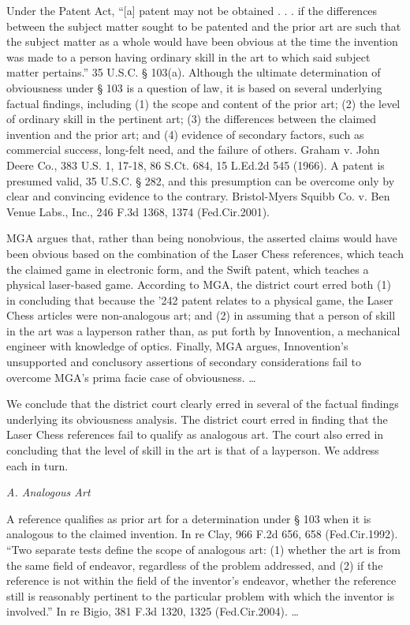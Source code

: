 Under the Patent Act, ``[a] patent may not be obtained . . . if the differences
between the subject matter sought to be patented and the prior art are such
that the subject matter as a whole would have been obvious at the time the
invention was made to a person having ordinary skill in the art to which said
subject matter pertains.'' 35 U.S.C. {\S} 103(a). Although the ultimate
determination of obviousness under {\S} 103 is a question of law, it is based
on several underlying factual findings, including (1) the scope and content of
the prior art; (2) the level of ordinary skill in the pertinent art; (3) the
differences between the claimed invention and the prior art; and (4) evidence
of secondary factors, such as commercial success, long-felt need, and the
failure of others. Graham v. John Deere Co., 383 U.S. 1, 17-18, 86 S.Ct. 684,
15 L.Ed.2d 545 (1966). A patent is presumed valid, 35 U.S.C. {\S} 282, and this
presumption can be overcome only by clear and convincing evidence to the
contrary. Bristol-Myers Squibb Co. v. Ben Venue Labs., Inc., 246 F.3d 1368,
1374 (Fed.Cir.2001).

MGA argues that, rather than being nonobvious, the asserted claims would have
been obvious based on the combination of the Laser Chess references, which
teach the claimed game in electronic form, and the Swift patent, which teaches
a physical laser-based game. According to MGA, the district court erred both
(1) in concluding that because the '242 patent relates to a physical game, the
Laser Chess articles were non-analogous art; and (2) in assuming that a person
of skill in the art was a layperson rather than, as put forth by Innovention, a
mechanical engineer with knowledge of optics. Finally, MGA argues,
Innovention's unsupported and conclusory assertions of secondary considerations
fail to overcome MGA's prima facie case of obviousness. {\dots}

We conclude that the district court clearly erred in several of the factual
findings underlying its obviousness analysis. The district court erred in
finding that the Laser Chess references fail to qualify as analogous art. The
court also erred in concluding that the level of skill in the art is that of a
layperson. We address each in turn.

{\centering
\textit{A. Analogous Art}
\par}

A reference qualifies as prior art for a determination under {\S} 103 when it is
analogous to the claimed invention. In re Clay, 966 F.2d 656, 658
(Fed.Cir.1992). ``Two separate tests define the scope of analogous art: (1)
whether the art is from the same field of endeavor, regardless of the problem
addressed, and (2) if the reference is not within the field of the inventor's
endeavor, whether the reference still is reasonably pertinent to the particular
problem with which the inventor is involved.'' In re Bigio, 381 F.3d 1320, 1325
(Fed.Cir.2004). {\dots}

